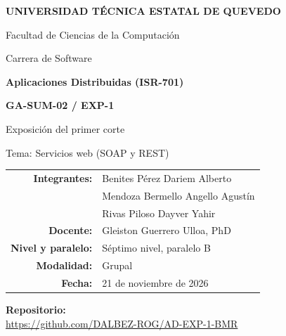 \documentclass[12pt,a4paper]{article}
\newcommand{\repourl}{https://github.com/DALBEZ-ROG/AD-EXP-1-BMR}
\newcommand{\fecha}{21 de noviembre de 2026}
\begin{document}
\begin{center}
  {\Large\bfseries UNIVERSIDAD TÉCNICA ESTATAL DE QUEVEDO\par}
  \vspace{4pt}
  {\large Facultad de Ciencias de la Computación\par}
  {\large Carrera de Software\par}
  \vspace{1.6cm}
  {\large\bfseries Aplicaciones Distribuidas (ISR-701)\par}
  \vspace{0.8cm}
  {\Large\bfseries GA-SUM-02 / EXP-1\par}
  \vspace{4pt}
  {\large Exposición del primer corte\par}
  \vspace{4pt}
  {Tema: Servicios web (SOAP y REST)\par}
\end{center}

\vspace{1.4cm}
\begin{center}
\renewcommand{\arraystretch}{1.5}
\begin{tabular}{>{\bfseries}r l}
  Integrantes: & Benites Pérez Dariem Alberto \\
               & Mendoza Bermello Angello Agustín \\
               & Rivas Piloso Dayver Yahir \\
  Docente:     & Gleiston Guerrero Ulloa, PhD \\
  Nivel y paralelo: & Séptimo nivel, paralelo B \\
  Modalidad:   & Grupal \\
  Fecha:       & \fecha \\
\end{tabular}
\end{center}

\vfill
\begin{center}
  {\bfseries Repositorio:}\\[4pt]
  {\small\url{\repourl}}
\end{center}
\vspace{1cm}
\end{document}
